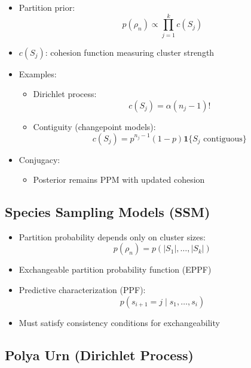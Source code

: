 \documentclass[12pt,oneside]{book}
\numberwithin{equation}{section}
\theoremstyle{definition}
\theoremstyle{plain}
\theoremstyle{remark}
\begin{document}
\begin{itemize}
\item Partition prior:
\[
p(\rho_n) \propto \prod_{j=1}^k c(S_j)
\]

\item $c(S_j)$: cohesion function measuring cluster strength

\item Examples:
\begin{itemize}
\item Dirichlet process:
\[
c(S_j) = \alpha (n_j - 1)!
\]

\item Contiguity (changepoint models):
\[
c(S_j) = p^{n_j - 1}(1-p)\mathbf{1}\{S_j \text{ contiguous}\}
\]
\end{itemize}

\item Conjugacy:
\begin{itemize}
\item Posterior remains PPM with updated cohesion
\end{itemize}
\end{itemize}

\subsection{Species Sampling Models (SSM)}

\begin{itemize}
\item Partition probability depends only on cluster sizes:
\[
p(\rho_n) = p(|S_1|,\dots,|S_k|)
\]

\item Exchangeable partition probability function (EPPF)

\item Predictive characterization (PPF):
\[
p(s_{i+1} = j \mid s_1,\dots,s_i)
\]

\item Must satisfy consistency conditions for exchangeability
\end{itemize}

\subsection*{Polya Urn (Dirichlet Process)}
\end{document}
